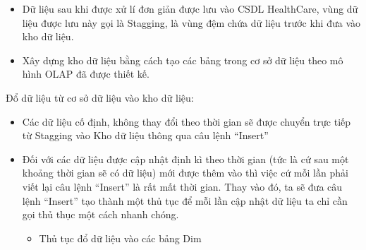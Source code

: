 \begin{itemize}
    \item Dữ liệu sau khi được xử lí đơn giản được lưu vào CSDL HealthCare, vùng dữ liệu
được lưu này gọi là Stagging, là vùng đệm chứa dữ liệu trước khi đưa vào kho dữ liệu.
\item Xây dựng kho dữ liệu bằng cách tạo các bảng trong cơ sở dữ liệu theo mô hình OLAP
đã được thiết kế.

\end{itemize}
Đổ dữ liệu từ cơ sở dữ liệu vào kho dữ liệu:
\begin{itemize}
    \item Các dữ liệu cố định, không thay đổi theo thời gian sẽ được chuyển trực tiếp từ
Stagging vào Kho dữ liệu thông qua câu lệnh “Insert”
\item Đối với các dữ liệu được cập nhật định kì theo thời gian (tức là cứ sau một khoảng
thời gian sẽ có dữ liệu) mới được thêm vào thì việc cứ mỗi lần phải viết lại câu lệnh
“Insert” là rất mất thời gian. Thay vào đó, ta sẽ đưa câu lệnh “Insert” tạo thành một
thủ tục để mỗi lần cập nhật dữ liệu ta chỉ cần gọi thủ thục một cách nhanh chóng.
\begin{itemize}
    \item Thủ tục đổ dữ liệu vào các bảng Dim
\end{itemize} 
\end{itemize}
